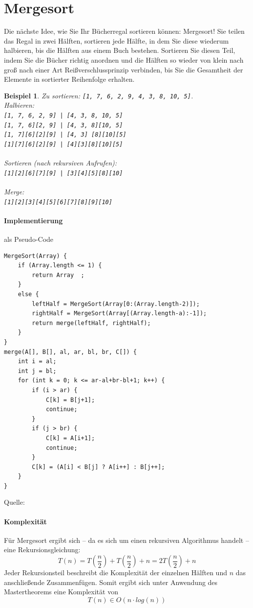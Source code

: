 \documentclass[11pt,a4paper]{scrartcl}
\newtheorem{example}{Beispiel}
\begin{document}
\section{Mergesort}
\label{mergesort}
Die nächste Idee, wie Sie Ihr Bücherregal sortieren können: Mergesort! Sie teilen das Regal in zwei Hälften, sortieren jede Hälfte, in dem Sie diese wiederum halbieren, bis die Hälften aus einem Buch bestehen. Sortieren Sie diesen Teil, indem Sie die Bücher richtig anordnen und die Hälften so wieder von klein nach groß nach einer Art Reißverschlussprinzip verbinden, bis Sie die Gesamtheit der Elemente in sortierter Reihenfolge erhalten. 
\begin{example} Zu sortieren: \texttt{[1, 7, 6, 2, 9, 4, 3, 8, 10, 5]}.\\
Halbieren: \\\texttt{[1, 7, 6, 2, 9] | [4, 3, 8, 10, 5]} \\
\texttt{[1, 7, 6][2, 9] | [4, 3, 8][10, 5]} \\
\texttt{[1, 7][6][2][9] | [4, 3] [8][10][5]} \\
\texttt{[1][7][6][2][9] | [4][3][8][10][5]}\\\\
Sortieren (nach rekursiven Aufrufen): \\
\texttt{[1][2][6][7][9] | [3][4][5][8][10]} \\\\
Merge: \\
\texttt{[1][2][3][4][5][6][7][8][9][10]}
\end{example}
\paragraph{Implementierung} als Pseudo-Code
\begin{lstlisting}
MergeSort(Array) {
	if (Array.length <= 1) {
		return Array  ;
  	}
  	else {
		leftHalf = MergeSort(Array[0:(Array.length-2)]);
		rightHalf = MergeSort(Array[(Array.length-a):-1]);
		return merge(leftHalf, rightHalf);
	}
}
merge(A[], B[], al, ar, bl, br, C[]) {
	int i = al;
	int j = bl;
	for (int k = 0; k <= ar-al+br-bl+1; k++) {
		if (i > ar) {
			C[k] = B[j+1];
			continue;		
		}
		if (j > br) {
			C[k] = A[i+1];
			continue;		
		}
		C[k] = (A[i] < B[j] ? A[i++] : B[j++];	
	}	
}
\end{lstlisting} Quelle: \parencite[][S. 28]{Taschenbuch}
\paragraph{Komplexität}
Für Mergesort ergibt sich -- da es sich um einen rekursiven Algorithmus handelt -- eine Rekursionsgleichung:
\[T(n) = T(\frac{n}{2}) + T(\frac{n}{2}) + n = 2T(\frac{n}{2}) + n\]
Jeder Rekursionsteil beschreibt die Komplexität der einzelnen Hälften und $n$ das anschließende Zusammenfügen. Somit ergibt sich unter Anwendung des Mastertheorems eine Komplexität von 
\[T(n) \in O(n \cdot log(n))\]
\end{document}
